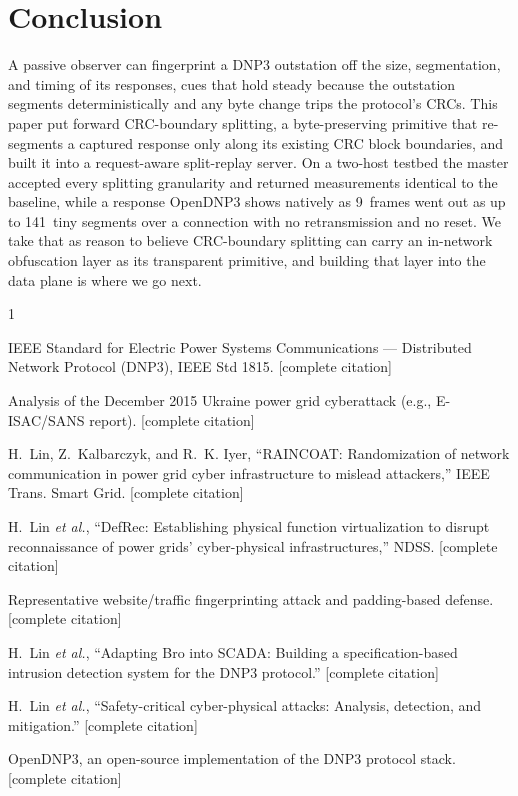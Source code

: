 \documentclass[conference]{IEEEtran}
\begin{document}
\section{Conclusion}

A passive observer can fingerprint a DNP3 outstation off the size, segmentation,
and timing of its responses, cues that hold steady because the outstation segments
deterministically and any byte change trips the protocol's CRCs. This paper put
forward CRC-boundary splitting, a byte-preserving primitive that re-segments a
captured response only along its existing CRC block boundaries, and built it into
a request-aware split-replay server. On a two-host testbed the master accepted
every splitting granularity and returned measurements identical to the baseline,
while a response OpenDNP3 shows natively as 9~frames went out as up to 141~tiny
segments over a connection with no retransmission and no reset. We take that as
reason to believe CRC-boundary splitting can carry an in-network obfuscation layer
as its transparent primitive, and building that layer into the data plane is where
we go next.

\begin{thebibliography}{1}

IEEE Standard for Electric Power Systems Communications --- Distributed Network
Protocol (DNP3), IEEE Std 1815. [complete citation]

Analysis of the December 2015 Ukraine power grid cyberattack (e.g., E-ISAC/SANS
report). [complete citation]

H.~Lin, Z.~Kalbarczyk, and R.~K. Iyer, ``RAINCOAT: Randomization of network
communication in power grid cyber infrastructure to mislead attackers,'' IEEE
Trans. Smart Grid. [complete citation]

H.~Lin \emph{et al.}, ``DefRec: Establishing physical function virtualization to
disrupt reconnaissance of power grids' cyber-physical infrastructures,'' NDSS.
[complete citation]

Representative website/traffic fingerprinting attack and padding-based defense.
[complete citation]

H.~Lin \emph{et al.}, ``Adapting Bro into SCADA: Building a specification-based
intrusion detection system for the DNP3 protocol.'' [complete citation]

H.~Lin \emph{et al.}, ``Safety-critical cyber-physical attacks: Analysis,
detection, and mitigation.'' [complete citation]

OpenDNP3, an open-source implementation of the DNP3 protocol stack. [complete
citation]

\end{thebibliography}
\end{document}
